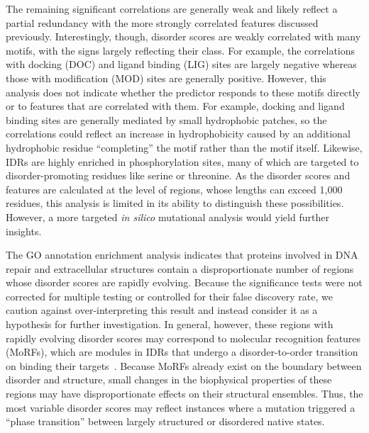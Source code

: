 The remaining significant correlations are generally weak and likely reflect a partial redundancy with the more strongly correlated features discussed previously. Interestingly, though, disorder scores are weakly correlated with many motifs, with the signs largely reflecting their class. For example, the correlations with docking (DOC) and ligand binding (LIG) sites are largely negative whereas those with modification (MOD) sites are generally positive. However, this analysis does not indicate whether the predictor responds to these motifs directly or to features that are correlated with them. For example, docking and ligand binding sites are generally mediated by small hydrophobic patches, so the correlations could reflect an increase in hydrophobicity caused by an additional hydrophobic residue ``completing'' the motif rather than the motif itself. Likewise, IDRs are highly enriched in phosphorylation sites, many of which are targeted to disorder-promoting residues like serine or threonine. As the disorder scores and features are calculated at the level of regions, whose lengths can exceed 1,000 residues, this analysis is limited in its ability to distinguish these possibilities. However, a more targeted \textit{in silico} mutational analysis would yield further insights.

The GO annotation enrichment analysis indicates that proteins involved in DNA repair and extracellular structures contain a disproportionate number of regions whose disorder scores are rapidly evolving. Because the significance tests were not corrected for multiple testing or controlled for their false discovery rate, we caution against over-interpreting this result and instead consider it as a hypothesis for further investigation. In general, however, these regions with rapidly evolving disorder scores may correspond to molecular recognition features (MoRFs), which are modules in IDRs that undergo a disorder-to-order transition on binding their targets~\cite{vanderLee2014}. Because MoRFs already exist on the boundary between disorder and structure, small changes in the biophysical properties of these regions may have disproportionate effects on their structural ensembles. Thus, the most variable disorder scores may reflect instances where a mutation triggered a ``phase transition'' between largely structured or disordered native states.

